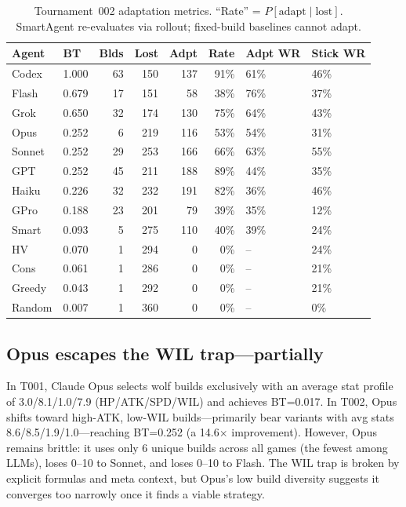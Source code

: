 \documentclass[11pt]{article}
\newcommand{\tOne}{T001}
\newcommand{\tTwo}{T002}
\begin{document}
\begin{table}[t]
\centering
\footnotesize
\setlength{\tabcolsep}{3pt}
\caption{Tournament~002 adaptation metrics. ``Rate'' = $P[\text{adapt}\mid\text{lost}]$. SmartAgent re-evaluates via rollout; fixed-build baselines cannot adapt.}
\label{tab:t2_adapt}
\begin{tabular}{llrrrrll}
\toprule
Agent & BT & Blds & Lost & Adpt & Rate & Adpt WR & Stick WR \\
\midrule
Codex & 1.000 & 63 & 150 & 137 & 91\% & 61\% & 46\% \\
Flash & 0.679 & 17 & 151 & 58 & 38\% & 76\% & 37\% \\
Grok & 0.650 & 32 & 174 & 130 & 75\% & 64\% & 43\% \\
Opus & 0.252 & 6 & 219 & 116 & 53\% & 54\% & 31\% \\
Sonnet & 0.252 & 29 & 253 & 166 & 66\% & 63\% & 55\% \\
GPT & 0.252 & 45 & 211 & 188 & 89\% & 44\% & 35\% \\
Haiku & 0.226 & 32 & 232 & 191 & 82\% & 36\% & 46\% \\
GPro & 0.188 & 23 & 201 & 79 & 39\% & 35\% & 12\% \\
\midrule
Smart & 0.093 & 5 & 275 & 110 & 40\% & 39\% & 24\% \\
HV & 0.070 & 1 & 294 & 0 & 0\% & -- & 24\% \\
Cons & 0.061 & 1 & 286 & 0 & 0\% & -- & 21\% \\
Greedy & 0.043 & 1 & 292 & 0 & 0\% & -- & 21\% \\
Random & 0.007 & 1 & 360 & 0 & 0\% & -- & 0\% \\
\bottomrule
\end{tabular}
\end{table}

\subsection{Opus escapes the WIL trap---partially}

In \tOne, Claude Opus selects wolf builds exclusively with an average stat profile of 3.0/8.1/1.0/7.9 (HP/ATK/SPD/WIL) and achieves BT=0.017.
In \tTwo, Opus shifts toward high-ATK, low-WIL builds---primarily bear variants with avg stats 8.6/8.5/1.9/1.0---reaching BT=0.252 (a 14.6$\times$ improvement).
However, Opus remains brittle: it uses only 6 unique builds across all games (the fewest among LLMs), loses 0--10 to Sonnet, and loses 0--10 to Flash.
The WIL trap is broken by explicit formulas and meta context, but Opus's low build diversity suggests it converges too narrowly once it finds a viable strategy.
\end{document}
